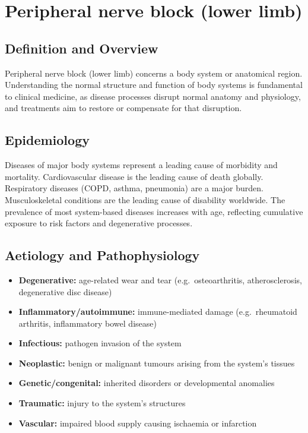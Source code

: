 \chapter{Peripheral nerve block (lower limb)}

\section*{Definition and Overview}
Peripheral nerve block (lower limb) concerns a body system or anatomical region. Understanding the normal structure and function of body systems is fundamental to clinical medicine, as disease processes disrupt normal anatomy and physiology, and treatments aim to restore or compensate for that disruption.

\section*{Epidemiology}
Diseases of major body systems represent a leading cause of morbidity and mortality. Cardiovascular disease is the leading cause of death globally. Respiratory diseases (COPD, asthma, pneumonia) are a major burden. Musculoskeletal conditions are the leading cause of disability worldwide. The prevalence of most system-based diseases increases with age, reflecting cumulative exposure to risk factors and degenerative processes.

\section*{Aetiology and Pathophysiology}
\begin{itemize}
    \item \textbf{Degenerative:} age-related wear and tear (e.g.\ osteoarthritis, atherosclerosis, degenerative disc disease)
    \item \textbf{Inflammatory/autoimmune:} immune-mediated damage (e.g.\ rheumatoid arthritis, inflammatory bowel disease)
    \item \textbf{Infectious:} pathogen invasion of the system
    \item \textbf{Neoplastic:} benign or malignant tumours arising from the system's tissues
    \item \textbf{Genetic/congenital:} inherited disorders or developmental anomalies
    \item \textbf{Traumatic:} injury to the system's structures
    \item \textbf{Vascular:} impaired blood supply causing ischaemia or infarction
\end{itemize}

